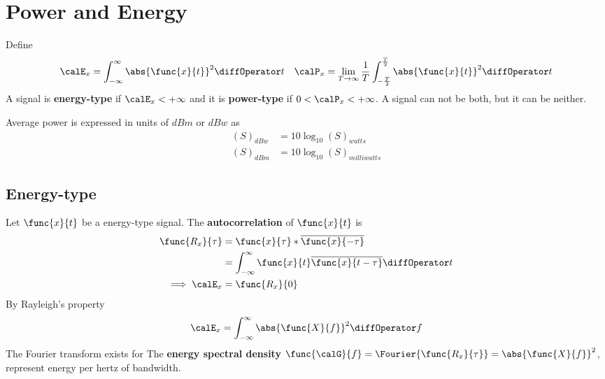 \section{Power and Energy}
Define 
\begin{align*}
    \calE_x = \int_{-\infty}^{\infty} \abs{\func{x}{t}}^2 \diffOperator t & & \calP_x = \lim_{T \to \infty} \dfrac{1}{T} \int_{-\frac{T}{2}}^{\frac{T}{2}} \abs{\func{x}{t}}^2 \diffOperator t
\end{align*}
A signal is \textbf{energy-type} if \(\calE_x < + \infty\) and it is \textbf{power-type} if \(0 < \calP_x < +\infty\). A signal can not be both, but it can be neither.
\begin{remark}
    Average power is expressed in units of \(\unit{dBm}\) or \(\unit{dBw}\) as 
    \begin{align*}
        (S)_{\unit{dBw}} &= 10 \log_{10} (S)_{\unit{watts}}\\
        (S)_{\unit{dBm}} &= 10 \log_{10} (S)_{\unit{milli watts}}
    \end{align*}
\end{remark}
\subsection{Energy-type}
Let \(\func{x}{t}\) be a energy-type signal. The \textbf{autocorrelation} of \(\func{x}{t}\) is 
\begin{align*}
    \func{R_x}{\tau} &= \func{x}{\tau} \ast \overline{\func{x}{-\tau}} \\
    &= \int_{-\infty}^{\infty} \func{x}{t} \overline{\func{x}{t - \tau}} \diffOperator t\\
    \implies \calE_x &= \func{R_x}{0}
\end{align*}
By Rayleigh's property 
\begin{equation*}
    \calE_x = \int_{-\infty}^{\infty} \abs{\func{X}{f}}^2 \diffOperator f
\end{equation*}
The Fourier transform exists for 
The \textbf{energy spectral density} \(\func{\calG}{f} = \Fourier{\func{R_x}{\tau}} = \abs{\func{X}{f}}^2\), represent energy per hertz of bandwidth. 
